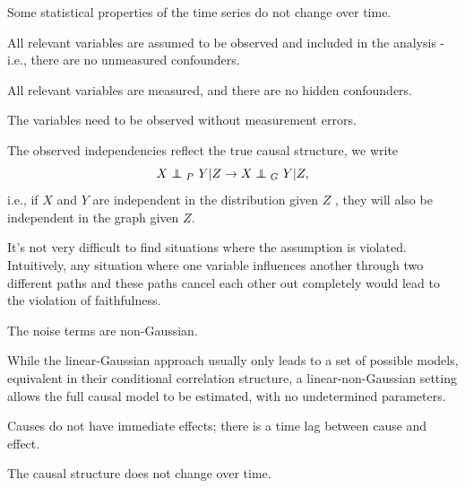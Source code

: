 \begin{definition}[Stationariety]
    Some statistical properties of the time series do not change over time.
\end{definition}
\begin{definition}
    All relevant variables are assumed to be observed and included in the analysis - i.e., there are no unmeasured confounders.
\end{definition}
\begin{definition}
    
\end{definition}
\begin{definition}
\end{definition}
\begin{definition}[Sufficiency]
    All relevant variables are measured, and there are no hidden confounders.
\end{definition}
\begin{definition}
     The variables need to be observed without measurement errors.
\end{definition}
\begin{definition}[Faithfulness]
    The observed independencies reflect the true causal structure, we write $$X \independent_P \ Y | Z \rightarrow X \independent_G \ Y | Z, $$ i.e., if $X$ and $Y$ are independent in the distribution given $Z$ , they will also be independent in the graph given $Z$.  
\end{definition}
It’s not very difficult to find situations where the assumption is violated. Intuitively, any situation where one variable influences another through two different paths and these paths cancel each other out completely would lead to the violation of faithfulness.
\begin{definition}
    The noise terms are non-Gaussian.
\end{definition}
While the linear-Gaussian approach usually only leads to a set of possible models, equivalent in their conditional correlation structure, a linear-non-Gaussian setting allows the full causal model to be estimated, with no undetermined parameters.
\begin{definition}
    Causes do not have immediate effects; there is a time lag between cause and effect.
\end{definition}
\begin{definition}
    The causal structure does not change over time.
\end{definition}
